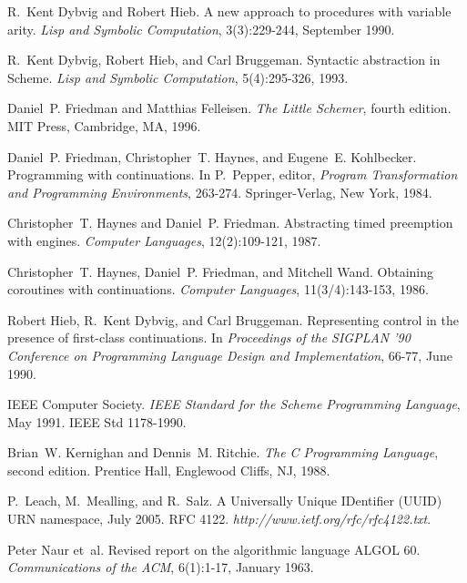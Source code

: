 R. Kent Dybvig and Robert Hieb.
A new approach to procedures with variable arity.
\textit{Lisp and Symbolic Computation}, 3(3):229-244, September
  1990.


R. Kent Dybvig, Robert Hieb, and Carl Bruggeman.
Syntactic abstraction in Scheme.
\textit{Lisp and Symbolic Computation}, 5(4):295-326, 1993.


Daniel P. Friedman and Matthias Felleisen.
\textit{The Little Schemer}, fourth edition.
MIT Press, Cambridge, MA, 1996.


Daniel P. Friedman, Christopher T. Haynes, and Eugene E. Kohlbecker.
Programming with continuations.
In P. Pepper, editor, \textit{Program Transformation and Programming
  Environments},  263-274. Springer-Verlag, New York, 1984.


Christopher T. Haynes and Daniel P. Friedman.
Abstracting timed preemption with engines.
\textit{Computer Languages}, 12(2):109-121, 1987.


Christopher T. Haynes, Daniel P. Friedman, and Mitchell Wand.
Obtaining coroutines with continuations.
\textit{Computer Languages}, 11(3/4):143-153, 1986.


Robert Hieb, R. Kent Dybvig, and Carl Bruggeman.
Representing control in the presence of first-class continuations.
In \textit{Proceedings of the SIGPLAN '90 Conference on Programming
  Language Design and Implementation},  66-77, June 1990.


IEEE Computer Society.
\textit{IEEE Standard for the Scheme Programming Language}, May
  1991.
IEEE Std 1178-1990.


Brian W. Kernighan and Dennis M. Ritchie.
\textit{The C Programming Language}, second edition.
Prentice Hall, Englewood Cliffs, NJ, 1988.


P. Leach, M. Mealling, and R. Salz.
A Universally Unique IDentifier (UUID) URN namespace, July
  2005.
RFC 4122.
 \textit{http://www.ietf.org/rfc/rfc4122.txt}.

Peter Naur et al.
Revised report on the algorithmic language ALGOL 60.
\textit{Communications of the ACM}, 6(1):1-17, January 1963.


